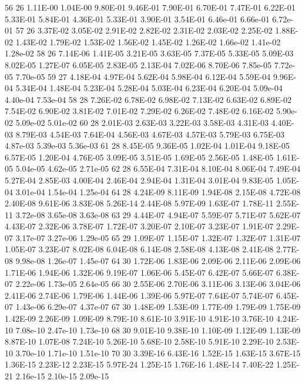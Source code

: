 56 26 	1.11E-00	1.04E-00	9.80E-01	9.46E-01	7.90E-01	6.70E-01	7.47E-01	6.22E-01	5.33E-01	5.84E-01	4.36E-01	5.33E-01	3.90E-01	3.54E-01	6.46e-01	6.66e-01	6.72e-01
57 26 	3.37E-02	3.05E-02	2.91E-02	2.82E-02	2.31E-02	2.03E-02	2.25E-02	1.88E-02	1.43E-02	1.79E-02	1.53E-02	1.56E-02	1.45E-02	1.26E-02	1.66e-02	1.41e-02	1.28e-02
58 26 	7.14E-06	1.41E-05	3.21E-05	3.63E-05	7.37E-05	5.33E-05	5.09E-03	8.02E-05	1.27E-07	6.05E-05	2.83E-05	2.13E-04	7.02E-06	8.70E-06	7.85e-05	7.72e-05	7.70e-05
59 27 	4.18E-04	4.97E-04	5.62E-04	5.98E-04	6.12E-04	5.59E-04	9.96E-04	5.34E-04	1.48E-04	5.23E-04	5.28E-04	5.03E-04	6.23E-04	6.20E-04	5.09e-04	4.40e-04	7.53e-04
58 28 	7.26E-02	6.78E-02	6.98E-02	7.13E-02	6.63E-02	6.89E-02	7.54E-02	6.90E-02	3.81E-02	7.01E-02	7.29E-02	6.26E-02	7.48E-02	6.16E-02	5.90e-02	5.09e-02	5.01e-02
60 28 	2.01E-03	2.63E-03	3.22E-03	3.58E-03	4.31E-03	4.40E-03	8.79E-03	4.54E-03	7.64E-04	4.56E-03	4.67E-03	4.57E-03	5.79E-03	6.75E-03	4.87e-03	5.39e-03	5.36e-03
61 28 	8.45E-05	9.36E-05	1.02E-04	1.01E-04	9.18E-05	6.57E-05	1.20E-04	4.76E-05	3.09E-05	3.51E-05	1.69E-05	2.56E-05	1.48E-05	1.61E-05	5.04e-05	4.62e-05	2.71e-05
62 28 	6.55E-04	7.31E-04	8.10E-04	8.06E-04	7.49E-04	5.27E-04	2.85E-03	4.00E-04	2.46E-04	2.94E-04	1.31E-04	3.01E-04	9.83E-05	1.05E-04	3.01e-04	1.54e-04	1.25e-04
64 28 	4.24E-09	8.11E-09	1.94E-08	2.15E-08	4.72E-08	2.40E-08	9.61E-06	3.83E-08	5.26E-14	2.44E-08	5.97E-09	1.63E-07	1.78E-11	2.55E-11	3.72e-08	3.65e-08	3.63e-08
63 29 	4.44E-07	4.94E-07	5.59E-07	5.71E-07	5.62E-07	4.43E-07	2.32E-06	3.78E-07	1.72E-07	3.20E-07	2.10E-07	3.23E-07	1.91E-07	2.29E-07	3.17e-07	3.27e-06	1.29e-05
65 29 	1.09E-07	1.15E-07	1.32E-07	1.32E-07	1.31E-07	1.05E-07	3.23E-07	8.02E-08	6.04E-08	6.14E-08	2.58E-08	4.13E-08	2.41E-08	2.77E-08	9.98e-08	1.26e-07	1.45e-07
64 30 	1.72E-06	1.83E-06	2.09E-06	2.11E-06	2.09E-06	1.71E-06	1.94E-06	1.32E-06	9.19E-07	1.06E-06	5.45E-07	6.42E-07	5.66E-07	6.38E-07	2.22e-06	1.73e-05	2.64e-05
66 30 	2.55E-06	2.70E-06	3.11E-06	3.13E-06	3.04E-06	2.41E-06	2.74E-06	1.79E-06	1.44E-06	1.39E-06	5.97E-07	7.64E-07	5.74E-07	6.45E-07	1.43e-06	6.29e-07	4.37e-07
67 30 	1.48E-09	1.53E-09	1.77E-09	1.79E-09	1.75E-09	1.42E-09	2.26E-09	1.09E-09	8.79E-10	8.61E-10	3.91E-10	4.91E-10	3.76E-10	4.24E-10	7.08e-10	2.47e-10	1.73e-10
68 30 	9.01E-10	9.38E-10	1.10E-09	1.12E-09	1.13E-09	8.87E-10	1.07E-08	7.24E-10	5.26E-10	5.68E-10	2.58E-10	5.91E-10	2.29E-10	2.53E-10	3.70e-10	1.71e-10	1.51e-10
70 30 	3.39E-16	6.43E-16	1.52E-15	1.63E-15	3.67E-15	1.36E-15	2.23E-12	2.23E-15	5.97E-24	1.25E-15	1.76E-16	1.48E-14	7.40E-22	1.25E-21	2.16e-15	2.10e-15	2.09e-15
